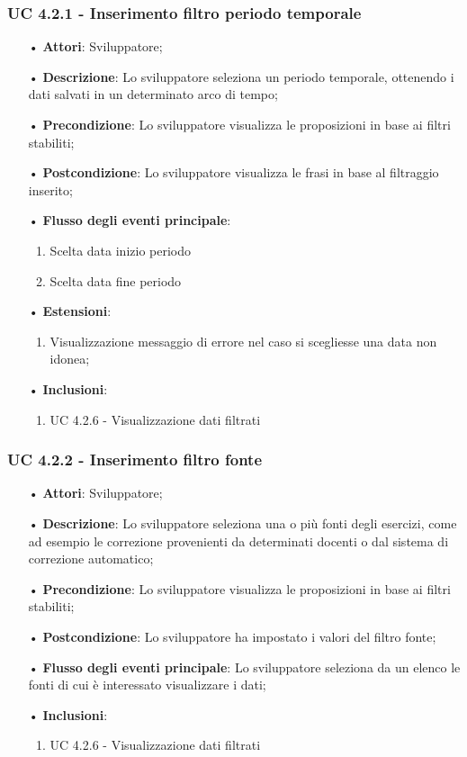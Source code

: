 \subsubsection{UC 4.2.1 - Inserimento filtro periodo temporale}
\begin{itemize}
\item[•]\textbf{Attori}: Sviluppatore;
\item[•]\textbf{Descrizione}: Lo sviluppatore seleziona un periodo temporale, ottenendo i dati salvati in un determinato arco di tempo;
\item[•]\textbf{Precondizione}: Lo sviluppatore visualizza le proposizioni in base ai filtri stabiliti;
\item[•]\textbf{Postcondizione}: Lo sviluppatore visualizza le frasi in base al filtraggio inserito;
\item[•]\textbf{Flusso degli eventi principale}: 
\begin{enumerate}
\item Scelta data inizio periodo
\item Scelta data fine periodo
\end{enumerate}
\item[•]\textbf{Estensioni}: 
\begin{enumerate}
	\item Visualizzazione messaggio di errore nel caso si scegliesse una data non idonea;
\end{enumerate}
\item[•]\textbf{Inclusioni}:
\begin{enumerate}
\item UC 4.2.6 - Visualizzazione dati filtrati
\end{enumerate}
\end{itemize}

\subsubsection{UC 4.2.2 - Inserimento filtro fonte}
\begin{itemize}
\item[•]\textbf{Attori}: Sviluppatore;
\item[•]\textbf{Descrizione}: Lo sviluppatore seleziona una o più fonti degli esercizi, come ad esempio le correzione provenienti da determinati docenti o dal sistema di correzione automatico;
\item[•]\textbf{Precondizione}: Lo sviluppatore visualizza le proposizioni in base ai filtri stabiliti;
\item[•]\textbf{Postcondizione}: Lo sviluppatore ha impostato i valori del filtro fonte;
\item[•]\textbf{Flusso degli eventi principale}: Lo sviluppatore seleziona da un elenco le fonti di cui è interessato visualizzare i dati;
\item[•]\textbf{Inclusioni}:
\begin{enumerate}
\item UC 4.2.6 - Visualizzazione dati filtrati
\end{enumerate}
\end{itemize}

